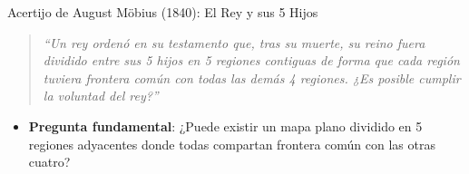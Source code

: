 \documentclass[
  ignorenonframetext,
]{beamer}
\providecommand{\tightlist}{%
  \setlength{\itemsep}{0pt}\setlength{\parskip}{0pt}}
\begin{document}
\begin{frame}{Acertijo de August Möbius (1840): El Rey y sus 5 Hijos}
\label{acertijo-de-august-muxf6bius-1840-el-rey-y-sus-5-hijos}
\begin{tcolorbox}[enhanced jigsaw, left=2mm, opacityback=0, titlerule=0mm, breakable, toptitle=1mm, rightrule=.15mm, bottomtitle=1mm, coltitle=black, title=\textcolor{quarto-callout-note-color}{\faInfo}\hspace{0.5em}{Testamento del Rey (Acertijo de August Möbius, 1840)}, colframe=quarto-callout-note-color-frame, colbacktitle=quarto-callout-note-color!10!white, arc=.35mm, toprule=.15mm, leftrule=.75mm, bottomrule=.15mm, opacitybacktitle=0.6, colback=white]

\begin{quote}
\emph{``Un rey ordenó en su testamento que, tras su muerte, su reino
fuera dividido entre sus 5 hijos en 5 regiones contiguas de forma que
cada región tuviera frontera común con todas las demás 4 regiones. ¿Es
posible cumplir la voluntad del rey?''}
\end{quote}

\end{tcolorbox}

\begin{itemize}
\tightlist
\item
  \textbf{Pregunta fundamental}: ¿Puede existir un mapa plano dividido
  en 5 regiones adyacentes donde todas compartan frontera común con las
  otras cuatro?
\end{itemize}
\end{frame}
\end{document}
